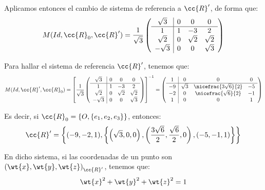 \begin{ejercicio}
\begin{enumerate}
        Aplicamos entonces el cambio de sistema de referencia a $\cc{R}'$, de forma que:
        \begin{equation*}
            M(Id, \cc{R}_0, \cc{R}') = \frac{1}{\sqrt{3}}\left(\begin{array}{c|ccc}
                \sqrt{3} & 0 & 0 & 0 \\ \hline
                1 & 1 & -3 & 2 \\
                \sqrt{2} & 0 & \sqrt{2} & \sqrt{2} \\
                -\sqrt{3} & 0 & 0 & \sqrt{3}
            \end{array}\right)
        \end{equation*}

        Para hallar el sistema de referencia $\cc{R}'$, tenemos que:
        \begin{equation*}
            M(Id, \cc{R}', \cc{R}_0) = \left[\frac{1}{\sqrt{3}}\left(\begin{array}{c|ccc}
                \sqrt{3} & 0 & 0 & 0 \\ \hline
                1 & 1 & -3 & 2 \\
                \sqrt{2} & 0 & \sqrt{2} & \sqrt{2} \\
                -\sqrt{3} & 0 & 0 & \sqrt{3}
            \end{array}\right)\right]^{-1}
            = \left(\begin{array}{c|ccc}
                1 & 0 & 0 & 0 \\ \hline
                -9 & \sqrt{3} & \nicefrac{3\sqrt{6}}{2} & -5 \\
                -2 & 0 & \nicefrac{\sqrt{6}}{2} & -1 \\
                1 & 0 & 0 & 1
            \end{array}\right)
        \end{equation*}

        Es decir, si $\cc{R}_0 = \{O, \{e_1,e_2,e_3\}\}$, entonces:
        \begin{equation*}
            \cc{R}' = \left\{(-9,-2,1), \left\{\left(\sqrt{3},0,0\right), \left(\frac{3\sqrt{6}}{2}, \frac{\sqrt{6}}{2}, 0\right), \left(-5,-1,1\right)\right\}\right\}
        \end{equation*}

        En dicho sistema, si las coordenadas de un punto son ${(\wt{x}, \wt{y}, \wt{z})}_{\cc{R}'}$, tenemos que:
        \begin{equation*}
            \wt{x}^2 + \wt{y}^2 + \wt{z}^2 = 1
        \end{equation*}


\end{enumerate}
\end{ejercicio}
